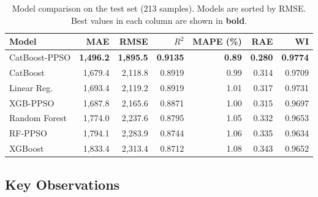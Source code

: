 \begin{table}[H]
\centering
\caption{Model comparison on the test set (213 samples). Models are sorted by RMSE. Best values in each column are shown in \textbf{bold}.}
\label{tab:model_comparison}
\begin{tabular}{@{}lrrrrrr@{}}
\toprule
\textbf{Model} & \textbf{MAE} & \textbf{RMSE} & \textbf{$R^2$} & \textbf{MAPE (\%)} & \textbf{RAE} & \textbf{WI} \\
\midrule
CatBoost-PPSO & \textbf{1{,}496.2} & \textbf{1{,}895.5} & \textbf{0.9135} & \textbf{0.89} & \textbf{0.280} & \textbf{0.9774} \\
CatBoost & 1{,}679.4 & 2{,}118.8 & 0.8919 & 0.99 & 0.314 & 0.9709 \\
Linear Reg. & 1{,}693.4 & 2{,}119.2 & 0.8919 & 1.01 & 0.317 & 0.9731 \\
XGB-PPSO & 1{,}687.8 & 2{,}165.6 & 0.8871 & 1.00 & 0.315 & 0.9697 \\
Random Forest & 1{,}774.0 & 2{,}237.6 & 0.8795 & 1.05 & 0.332 & 0.9653 \\
RF-PPSO & 1{,}794.1 & 2{,}283.9 & 0.8744 & 1.06 & 0.335 & 0.9634 \\
XGBoost & 1{,}833.4 & 2{,}313.4 & 0.8712 & 1.08 & 0.343 & 0.9652 \\
\bottomrule
\end{tabular}
\end{table}

\subsection{Key Observations}

